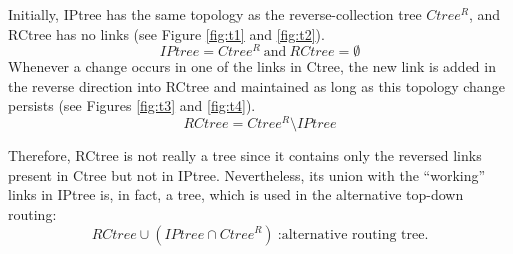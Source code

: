 Initially, IPtree has the same topology as the reverse-collection tree
$Ctree^{R}$, and RCtree has no links (see Figure \ref{fig:t1} and
\ref{fig:t2}).
$$
IPtree = Ctree^{R} \ \text{and} \ RCtree = \emptyset
$$
Whenever a change occurs in one of the links in Ctree, the new link
is added in the reverse direction into RCtree and maintained as long
as this topology change persists (see Figures \ref{fig:t3} and
\ref{fig:t4}).
$$
RCtree = Ctree^{R} \setminus IPtree
$$

Therefore, RCtree is not really a tree since it contains only the
reversed links present in Ctree but not in IPtree. Nevertheless, its
union with the ``working'' links in IPtree is, in fact, a tree,
which is used in the alternative top-down routing:
$$
RCtree \cup (IPtree \cap Ctree^{R}) \  \text{:alternative routing tree.}
$$

